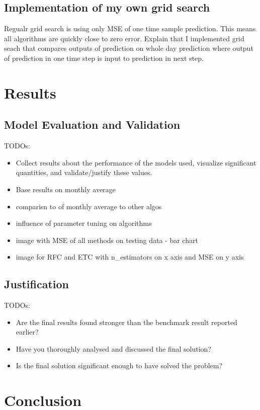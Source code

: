 \documentclass{article}
\begin{document}
\subsection{Implementation of my own grid search}
Regualr grid search is using only MSE of one time sample prediction. This means all algorithms are quickly close to zero error. 
Explain that I implemented grid seach that compares outputs of prediction on whole day prediction where output of prediction in one time step is input to prediction in next step.

\section{Results}
\subsection{Model Evaluation and Validation}
\color{red}
TODOs:
\begin{itemize}
    \item Collect results about the performance of the models used, visualize significant quantities, and validate/justify these values. 
    \item Base results on monthly average
    \item comparisn to of monthly average to other algos
    \item influence of parameter tuning on algorithms
    \item image with MSE of all methods on testing data - bar chart
    \item image for RFC and ETC with n\_estimators on x axis and MSE on y axis
\end{itemize}
\color{black}

\subsection{Justification}
\color{red}
TODOs:
\begin{itemize}
    \item Are the final results found stronger than the benchmark result reported earlier?
    \item Have you thoroughly analysed and discussed the final solution?
    \item Is the final solution significant enough to have solved the problem?
\end{itemize}
\color{black}

\section{Conclusion}
\end{document}
